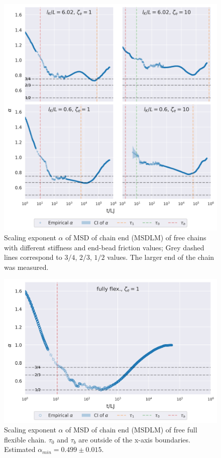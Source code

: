 \documentclass[
    paper=A4,pagesize=automedia,fontsize=12pt,
    BCOR=15mm,DIV=22,
    twoside,headinclude,footinclude=false,
    fleqn,             %
    bibliography=totocnumbered,          %
    listof=totoc,                %
    listof=flat,                 %
    cleardoublepage=empty      %
    numbers=endperiod
]{scrartcl}
\begin{document}
\begin{figure}
    \centering
    \includegraphics[width=\textwidth]{17+18+19+20-exp-alpha.png}
    \caption{Scaling exponent $\alpha$ of MSD of chain end (MSDLM) 
    of free chains with different stiffness and end-bead friction values;
    Grey dashed lines correspond to $3/4$, $2/3$, $1/2$ values.
    The larger end of the chain was measured. 
    }
    \label{fig:alpha_free}
\end{figure}

\begin{figure}
    \centering
    \includegraphics[width=\textwidth]{17+18+19+20-exp-full-flex-alpha.png}
    \caption{Scaling exponent $\alpha$ of MSD of chain end (MSDLM) 
    of free full flexible chain. $\tau_0$ and $\tau_b$ are outside of the
    x-axis boundaries. Estimated $\alpha_{min}=0.499 \pm 0.015$.
    }
    \label{fig:alpha_free_full_flex}
\end{figure}
\end{document}
